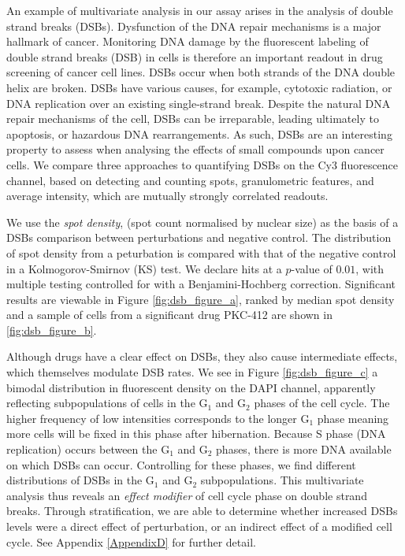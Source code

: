 An example of multivariate analysis in our assay arises in the analysis of double strand breaks (DSBs). Dysfunction of the DNA repair mechanisms is a major hallmark of cancer. Monitoring DNA damage by the fluorescent labeling of double strand breaks (DSB) in cells is therefore an important readout in drug screening of cancer cell lines. DSBs occur when both strands of the DNA double helix are broken. DSBs have various causes, for example, cytotoxic radiation, or DNA replication over an existing single-strand break. Despite the natural DNA repair mechanisms of the cell, DSBs can be irreparable, leading ultimately to apoptosis, or hazardous DNA rearrangements. As such, DSBs are an interesting property to assess when analysing the effects of small compounds upon cancer cells. We compare three approaches to quantifying DSBs on the Cy3 fluorescence channel, based on detecting and counting spots, granulometric features, and average intensity, which are mutually strongly correlated readouts.

We use the \emph{spot density}, (spot count normalised by nuclear size) as the basis of a DSBs comparison between perturbations and negative control. The distribution of spot density from a peturbation is compared with that of the negative control in a Kolmogorov-Smirnov (KS) test. We declare hits at a $p$-value of $0.01$, with multiple testing controlled for with a Benjamini-Hochberg correction. Significant results are viewable in  Figure \ref{fig:dsb_figure_a}, ranked by median spot density and a sample of cells from a significant drug PKC-412 are shown in \ref{fig:dsb_figure_b}. 

Although drugs have a clear effect on DSBs, they also cause intermediate effects, which themselves modulate DSB rates. We see in Figure \ref{fig:dsb_figure_c} a bimodal distribution in fluorescent density on the DAPI channel, apparently reflecting subpopulations of cells in the G$_1$ and G$_2$ phases of the cell cycle. The higher frequency of low intensities corresponds to the longer G$_1$ phase meaning more cells will be fixed in this phase after hibernation. Because S phase (DNA replication) occurs between the G$_1$ and G$_2$ phases, there is more DNA available on which DSBs can occur.  Controlling for these phases, we find different distributions of DSBs in the G$_1$ and G$_2$ subpopulations. This multivariate analysis thus reveals an \emph{effect modifier} of cell cycle phase on double strand breaks. Through stratification, we are able to determine whether increased DSBs levels were a direct effect of perturbation, or an indirect effect of a modified cell cycle. See Appendix \ref{AppendixD} for further detail.


